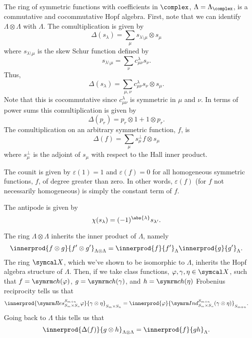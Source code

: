 The ring of symmetric functions with coefficients in \(\complex\), \(\Lambda = \Lambda_{\complex}\), is a commutative and cocommutative Hopf algebra.
First, note that we can identify \(\Lambda \otimes \Lambda\) with \(\Lambda\).
The comultiplication is given by
\begin{equation}
    \Delta(s_\lambda) = \sum_{\mu} s_{\lambda\setminus \mu} \otimes s_\mu
\end{equation}
where \(s_{\lambda \setminus \mu}\) is the skew Schur function defined by
\begin{equation}
    s_{\lambda \setminus \mu} = \sum_\nu c^\lambda_{\mu\nu} s_\nu.
\end{equation}
Thus,
\begin{equation}
    \Delta(s_\lambda) = \sum_{\mu, \nu} c^\lambda_{\mu\nu} s_{\nu} \otimes s_\mu.
\end{equation}
Note that this is cocommutative since \(c^\lambda_{\mu\nu}\) is symmetric in \(\mu\) and \(\nu\).
In terms of power sums this comultiplication is given by
\begin{equation}
    \Delta(p_r) = p_r \otimes 1 + 1 \otimes p_r.
\end{equation}
The comultiplication on an arbitrary symmetric function, \(f\), is
\begin{equation}
    \Delta(f) = \sum_\mu s_\mu^{\perp} f \otimes s_\mu
\end{equation}
where \(s_\mu^{\perp}\) is the adjoint of \(s_\mu\) with respect to the Hall inner product.

The counit is given by \(\varepsilon(1) = 1\) and \(\varepsilon(f) = 0\) for all homogeneous symmetric functions, \(f\), of degree greater than zero.
In other words, \(\varepsilon(f)\) (for \(f\) not necessarily homogeneous) is simply the constant term of \(f\).

The antipode is given by
\begin{equation}
    \chi(s_\lambda) = (-1)^{\abs{\lambda}} s_{\lambda'}.
\end{equation}

The ring \(\Lambda \otimes \Lambda\) inherits the inner product of \(\Lambda\), namely
\begin{equation}
    \innerprod{f \otimes g}{f' \otimes g'}_{\Lambda \otimes \Lambda} = \innerprod{f}{f'}_{\Lambda} \innerprod{g}{g'}_{\Lambda}.
\end{equation}
The ring \(\classFunctions\), which we've shown to be isomorphic to \(\Lambda\), inherits the Hopf algebra structure of \(\Lambda\).
Then, if we take class functions, \(\varphi, \gamma, \eta \in \classFunctions\), such that \(f = \ch(\varphi)\), \(g = \ch(\gamma)\), and \(h = \ch(\eta)\) Frobenius reciprocity tells us that
\begin{equation}
    \innerprod{\Res^{S_{m+n}}_{S_m \times S_n} \varphi}{\gamma \otimes \eta}_{S_m \times S_n} = \innerprod{\varphi}{\Ind^{S_{m+n}}_{S_m \times S_n} (\gamma \otimes \eta)}_{S_{m + n}}.
\end{equation}
Going back to \(\Lambda\) this tells us that
\begin{equation}
    \innerprod{\Delta(f)}{g \otimes h}_{\Lambda \otimes \Lambda} = \innerprod{f}{gh}_{\Lambda}.
\end{equation}

